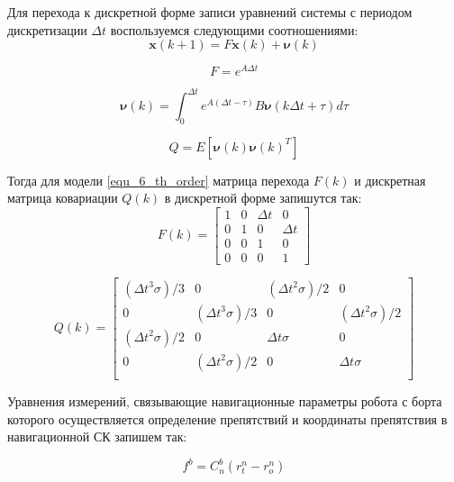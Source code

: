 \documentclass[14pt]{article}
\begin{document}
Для перехода к дискретной форме записи  уравнений системы с периодом дискретизации $\Delta t$ воспользуемся следующими соотношениями:
\begin{equation}\label{equ_ekf_system_discrete}
\boldsymbol x(k+1) = F\boldsymbol x(k) + \boldsymbol \nu(k)
\end{equation}

\begin{equation}
	F = e^{A\Delta t}
\end{equation}

\begin{equation}
	\boldsymbol\nu(k) = \int_0^{\Delta t}e^{A(\Delta t-\tau)}B\boldsymbol \nu(k\Delta t +\tau)d\tau
\end{equation}

\begin{equation}
	Q = E\left[\boldsymbol \nu(k)\boldsymbol \nu(k)^T\right]
\end{equation}

Тогда для модели \eqref{equ_6_th_order} матрица перехода $F(k)$ и дискретная матрица ковариации $Q(k)$ в дискретной форме запишутся так:
\begin{equation}\label{equ:system_matrix_sixth}
	F(k) = 
	\begin{bmatrix}
		 1 & 0 & \Delta t & 0 \\
		 0 & 1 & 0 & \Delta t \\
                 0 & 0 & 1 & 0\\
                 0 & 0 & 0 & 1
	 \end{bmatrix}
\end{equation}

\begin{equation}
	Q(k) = 
	\begin{bmatrix}
    (\Delta t^3  \sigma)/3 &  0 &   (\Delta t^2 \sigma)/2 &  0 \\
    0 & (\Delta t^3 \sigma)/3 & 0 & (\Delta t^2 \sigma)/2 \\
    (\Delta t^2 \sigma)/2 &  0 &  \Delta t \sigma &  0 \\
    0 & (\Delta t^2 \sigma)/2 & 0 & \Delta t \sigma \\
	 \end{bmatrix}
\end{equation}

Уравнения измерений, связывающие навигационные параметры робота с борта которого осуществляется определение препятствий и координаты препятствия в навигационной СК запишем так:
        
\begin{equation}
f^b = C_n^b \left(r_t^n - r_o^n \right)
\end{equation}      
\end{document}
